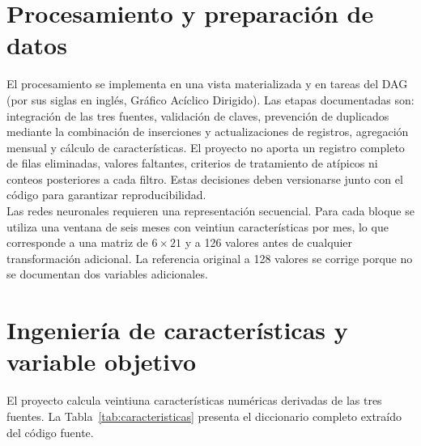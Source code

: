 \section{Procesamiento y preparación de datos}

El procesamiento se implementa en una vista materializada y en tareas del DAG (por sus siglas en inglés, Gráfico Acíclico Dirigido). Las etapas documentadas son: integración de las tres fuentes, validación de claves, prevención de duplicados mediante la combinación de inserciones y actualizaciones de registros, agregación mensual y cálculo de características. El proyecto no aporta un registro completo de filas eliminadas, valores faltantes, criterios de tratamiento de atípicos ni conteos posteriores a cada filtro. Estas decisiones deben versionarse junto con el código para garantizar reproducibilidad.\\

Las redes neuronales requieren una representación secuencial. Para cada bloque se utiliza una ventana de seis meses con veintiun características por mes, lo que corresponde a una matriz de $6 \times 21$ y a 126 valores antes de cualquier transformación adicional. La referencia original a 128 valores se corrige porque no se documentan dos variables adicionales.

\section{Ingeniería de características y variable objetivo}

El proyecto calcula veintiuna características numéricas derivadas de las tres fuentes. La Tabla~\ref{tab:caracteristicas} presenta el diccionario completo extraído del código fuente.

